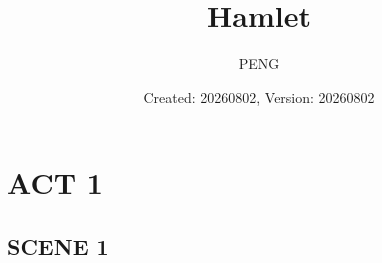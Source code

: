 \documentclass{article}
\title{Hamlet}
\author{PENG}
\date{Created: 20260802, Version: 20260802}
\begin{document}
\maketitle
\tableofcontents
\section{ACT 1}
\subsection{SCENE 1}
\cite{SHAKESPEARE_2008_HAMLET}

\printbibliography
\end{document}
